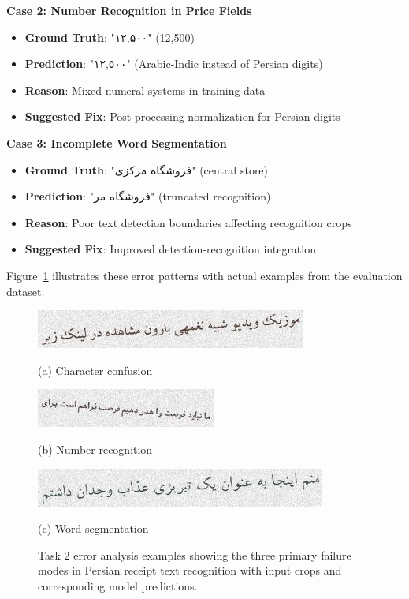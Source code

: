 \documentclass[11pt,a4paper]{article}
\begin{document}
\textbf{Case 2: Number Recognition in Price Fields}
\begin{itemize}
  \item \textbf{Ground Truth}: "۱۲,۵۰۰" (12,500)
  \item \textbf{Prediction}: "١٢,٥٠٠" (Arabic-Indic instead of Persian digits)
  \item \textbf{Reason}: Mixed numeral systems in training data
  \item \textbf{Suggested Fix}: Post-processing normalization for Persian digits
\end{itemize}

\textbf{Case 3: Incomplete Word Segmentation}
\begin{itemize}
  \item \textbf{Ground Truth}: "فروشگاه مرکزی" (central store)
  \item \textbf{Prediction}: "فروشگاه مر" (truncated recognition)
  \item \textbf{Reason}: Poor text detection boundaries affecting recognition crops
  \item \textbf{Suggested Fix}: Improved detection-recognition integration
\end{itemize}

Figure~\ref{fig:task2-errors} illustrates these error patterns with actual examples from the evaluation dataset.

\begin{figure}[h]
  \centering
  \begin{minipage}[b]{0.32\linewidth}
    \centering
    \includegraphics[width=\linewidth]{figures/error_01.png}
    \caption*{(a) Character confusion}
  \end{minipage}\hfill
  \begin{minipage}[b]{0.32\linewidth}
    \centering
    \includegraphics[width=\linewidth]{figures/error_02.png}
    \caption*{(b) Number recognition}
  \end{minipage}\hfill
  \begin{minipage}[b]{0.32\linewidth}
    \centering
    \includegraphics[width=\linewidth]{figures/error_03.png}
    \caption*{(c) Word segmentation}
  \end{minipage}
  \caption{Task 2 error analysis examples showing the three primary failure modes in Persian receipt text recognition with input crops and corresponding model predictions.}
  \label{fig:task2-errors}
\end{figure}
\end{document}
